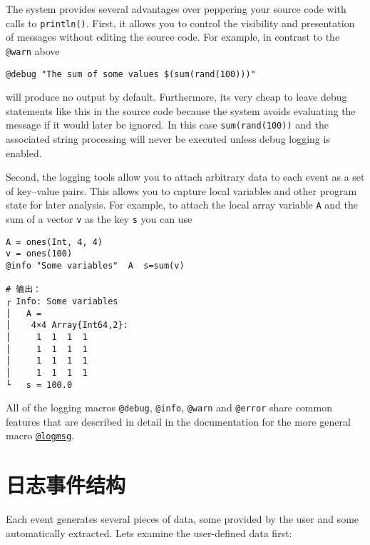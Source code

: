 The system provides several advantages over peppering your source code with calls to \texttt{println()}.  First, it allows you to control the visibility and presentation of messages without editing the source code.  For example, in contrast to the \texttt{@warn} above




\begin{verbatim}
@debug "The sum of some values $(sum(rand(100)))"
\end{verbatim}



will produce no output by default.  Furthermore, it{\textquotesingle}s very cheap to leave debug statements like this in the source code because the system avoids evaluating the message if it would later be ignored.  In this case \texttt{sum(rand(100))} and the associated string processing will never be executed unless debug logging is enabled.



Second, the logging tools allow you to attach arbitrary data to each event as a set of key–value pairs. This allows you to capture local variables and other program state for later analysis. For example, to attach the local array variable \texttt{A} and the sum of a vector \texttt{v} as the key \texttt{s} you can use




\begin{verbatim}
A = ones(Int, 4, 4)
v = ones(100)
@info "Some variables"  A  s=sum(v)

# 输出：
┌ Info: Some variables
│   A =
│    4×4 Array{Int64,2}:
│     1  1  1  1
│     1  1  1  1
│     1  1  1  1
│     1  1  1  1
└   s = 100.0
\end{verbatim}



All of the logging macros \texttt{@debug}, \texttt{@info}, \texttt{@warn} and \texttt{@error} share common features that are described in detail in the documentation for the more general macro \hyperlink{2787319849348710857}{\texttt{@logmsg}}.



\hypertarget{16412881529124994328}{}


\section{日志事件结构}



Each event generates several pieces of data, some provided by the user and some automatically extracted. Let{\textquotesingle}s examine the user-defined data first:



